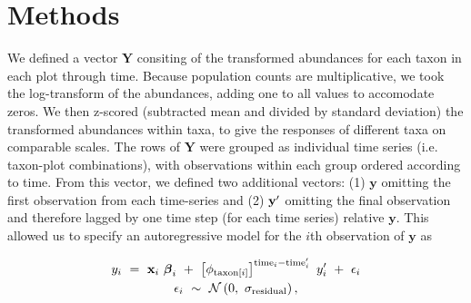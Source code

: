 

\section*{Methods}

We defined a vector $\mathbf{Y}$ consiting of the transformed abundances for each taxon in each plot through time. Because
population counts are multiplicative, we took the log-transform of the abundances, adding one to all values to accomodate
zeros. We then z-scored (subtracted mean and divided by standard deviation) the transformed abundances within taxa, to give the
responses of different taxa on comparable scales. The rows of $\mathbf{Y}$ were grouped as individual time series (i.e. taxon-plot
combinations), with observations within each group ordered according to time. From this vector, we defined two additional vectors:
(1) $\mathbf{y}$ omitting the first observation from each time-series and (2) $\mathbf{y\sp{\prime}}$ omitting the final observation
and therefore lagged by one time step (for each time series) relative $\mathbf{y}$. This allowed us to specify an autoregressive model for the $i$th observation of $\mathbf{y}$ as

\begin{equation} \label{eq:y-i}
\begin{gathered}
y_i~=~\mathbf{x}_i~{\boldsymbol\beta}_i~+~\left[\phi_{\text{taxon}[i]}\right]^{\text{time}_i-\text{time}\sp{\prime}_i}~
        y\sp{\prime}_i~+~\epsilon_i \\
\epsilon_i~\sim~\mathcal{N}\left(0,~\sigma_{\text{residual}}\right),
\end{gathered}
\end{equation}

